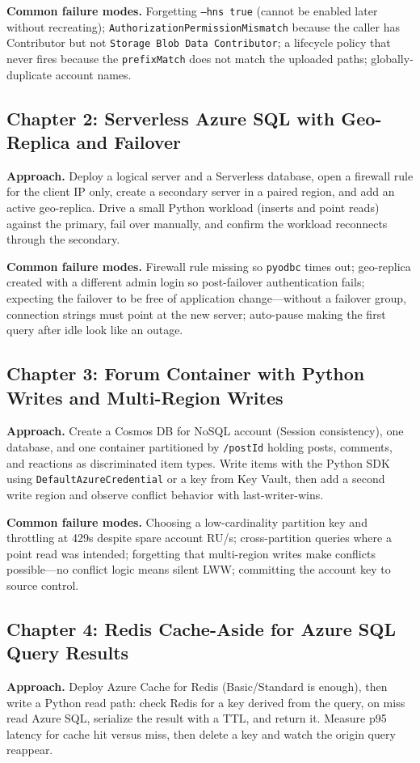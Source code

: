 \textbf{Common failure modes.} Forgetting \texttt{--hns true} (cannot be enabled later without
recreating); \texttt{AuthorizationPermissionMismatch} because the caller has Contributor but not
\texttt{Storage Blob Data Contributor}; a lifecycle policy that never fires because the
\texttt{prefixMatch} does not match the uploaded paths; globally-duplicate account names.

\subsection*{Chapter 2: Serverless Azure SQL with Geo-Replica and Failover}
\textbf{Approach.} Deploy a logical server and a Serverless database, open a firewall rule for
the client IP only, create a secondary server in a paired region, and add an active
geo-replica. Drive a small Python workload (inserts and point reads) against the primary,
fail over manually, and confirm the workload reconnects through the secondary.

\textbf{Common failure modes.} Firewall rule missing so \texttt{pyodbc} times out; geo-replica
created with a different admin login so post-failover authentication fails; expecting the
failover to be free of application change---without a failover group, connection strings must
point at the new server; auto-pause making the first query after idle look like an outage.

\subsection*{Chapter 3: Forum Container with Python Writes and Multi-Region Writes}
\textbf{Approach.} Create a Cosmos DB for NoSQL account (Session consistency), one database, and
one container partitioned by \texttt{/postId} holding posts, comments, and reactions as
discriminated item types. Write items with the Python SDK using
\texttt{DefaultAzureCredential} or a key from Key Vault, then add a second write region and
observe conflict behavior with last-writer-wins.

\textbf{Common failure modes.} Choosing a low-cardinality partition key and throttling at 429s
despite spare account RU/s; cross-partition queries where a point read was intended; forgetting
that multi-region writes make conflicts possible---no conflict logic means silent LWW; committing
the account key to source control.

\subsection*{Chapter 4: Redis Cache-Aside for Azure SQL Query Results}
\textbf{Approach.} Deploy Azure Cache for Redis (Basic/Standard is enough), then write a Python
read path: check Redis for a key derived from the query, on miss read Azure SQL, serialize the
result with a TTL, and return it. Measure p95 latency for cache hit versus miss, then delete a
key and watch the origin query reappear.

